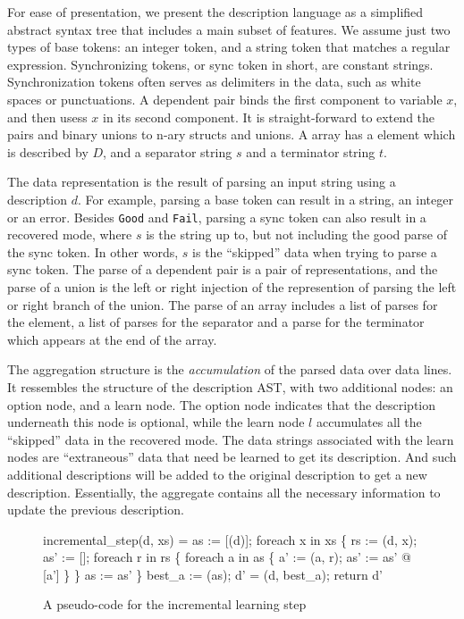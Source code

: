 For ease of presentation, we present the description language as a simplified abstract
syntax tree that includes a main subset of \pads{} features. 
We assume just two types of base tokens: 
an integer token, and a string token that matches a
regular expression. Synchronizing tokens, or sync token in short, are constant strings. 
Synchronization tokens often
serves as delimiters in the data, such as white spaces or punctuations.
A dependent pair binds
the first component to variable $x$, and then usess $x$ in its second component. It is 
straight-forward to extend the pairs and binary unions to n-ary structs and unions.
A array has a element which is described by $D$, and a separator string $s$ and a
terminator string $t$. 

The data representation is the result of parsing an input string using a description $d$.
For example, parsing a base token can result in a string, an integer or an error.
Besides {\tt Good} and {\tt Fail}, parsing a sync token can also result in 
a recovered mode, where $s$ is the string up to, but not including the good parse of the
sync token. In other words, $s$ is the ``skipped'' data when trying to parse a sync token.
The parse of a dependent pair is a pair of representations, and the
parse of a union is the left or right injection of the represention of parsing the left or
right branch of the union. The parse of an array includes a list of parses for the element,
a list of parses for the separator and a parse for the terminator which appears at the end of
the array.

The aggregation structure is the {\em accumulation} of the parsed data over data lines.
It ressembles the structure of the description AST, with two additional nodes: an option
node, and a learn node. The option node indicates that the description underneath this node is
optional, while the learn node $l$ accumulates all the ``skipped'' data in the recovered mode.
The data strings associated with the learn nodes are ``extraneous'' data that need be learned to
get its description. And such additional descriptions will be added to the original description
to get a new description. Essentially, the aggregate contains all the necessary information
to update the previous description.

\begin{figure}[t]
\begin{codebox}
incremental_step(d, xs) =
  as := [(d)];
  foreach x in xs \{
    rs := (d, x);
    as' := [];
    foreach r in rs \{
      foreach a in as \{
        a' := (a, r); 
        as' := as' @ [a']
      \}
    \}
    as := as'
  \} 
  best_a := (as);
  d' = (d, best_a);  
  return d'
\end{codebox}
\caption{A pseudo-code for the incremental learning step}
\label{fig:inc-learning}
\end{figure}

